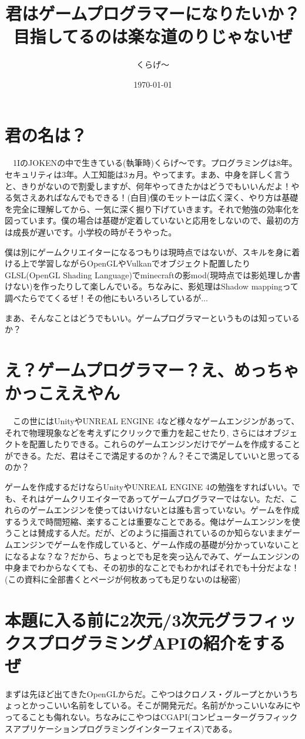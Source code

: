 \documentclass[12pt,a4paper]{jsarticle}
\title{君はゲームプログラマーになりたいか？ \\ 目指してるのは楽な道のりじゃないぜ}
\author{くらげ～}
\date{\today}
\begin{document}
\maketitle
\section{君の名は？}
　1IのJOKENの中で生きている(執筆時)くらげ～です。プログラミングは8年。セキュリティは3年。人工知能は3ヵ月。やってます。まあ、中身を詳しく言うと、きりがないので割愛しますが、何年やってきたかはどうでもいいんだよ！やる気さえあればなんでもできる！(白目)僕のモットーは広く深く、やり方は基礎を完全に理解してから、一気に深く掘り下げていきます。それで勉強の効率化を図っています。僕の場合は基礎が定着していないと応用をしないので、最初の方は成長が遅いです。小学校の時がそうやった。

僕は別にゲームクリエイターになるつもりは現時点ではないが、スキルを身に着ける上で学習しながらOpenGLやVulkanでオブジェクト配置したりGLSL(OpenGL Shading Language)でminecraftの影mod(現時点では影処理しか書けない)を作ったりして楽しんでいる。ちなみに、影処理はShadow mappingって調べたらでてくるぜ！その他にもいろいろしているが...

まあ、そんなことはどうでもいい。ゲームプログラマーというものは知っているか？


\section{え？ゲームプログラマー？え、めっちゃかっこええやん}
　この世にはUnityやUNREAL ENGINE 4など様々なゲームエンジンがあって、それで物理現象などを考えずにクリックで重力を起こせたり,
さらにはオブジェクトを配置したりできる。これらのゲームエンジンだけでゲームを作成することができる。ただ、君はそこで満足するのか？ん？そこで満足していいと思ってるのか？

ゲームを作成するだけならUnityやUNREAL ENGINE 4の勉強をすればいい。でも、それはゲームクリエイターであってゲームプログラマーではない。ただ、これらのゲームエンジンを使ってはいけないとは誰も言っていない。ゲームを作成するうえで時間短縮、楽することは重要なことである。俺はゲームエンジンを使うことは賛成する人だ。だが、どのように描画されているのか知らないままゲームエンジンでゲームを作成していると、ゲーム作成の基礎が分かっていないことになるよな？な？だから、ちょっとでも足を突っ込んでみて、ゲームエンジンの中身までわからなくても、その初歩的なことでもわかればそれでも十分だよな！(この資料に全部書くとページが何枚あっても足りないのは秘密)


\section{本題に入る前に2次元/3次元グラフィックスプログラミングAPIの紹介をするぜ}
 まずは先ほど出てきたOpenGLからだ。こやつはクロノス・グループとかいうちょっとかっこいい名前をしている。そこが開発元だ。名前がかっこいいなみにやってることも侮れない。ちなみにこやつはCGAPI(コンピューターグラフィックスアプリケーションプログラミングインターフェイス)である。
\end{document}
